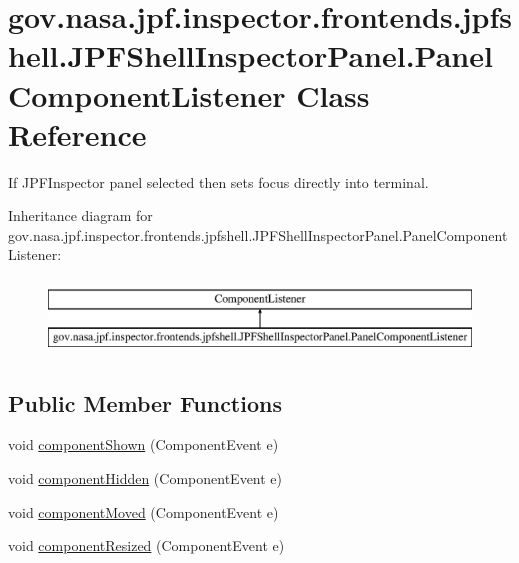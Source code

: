 \hypertarget{classgov_1_1nasa_1_1jpf_1_1inspector_1_1frontends_1_1jpfshell_1_1_j_p_f_shell_inspector_panel_1_1_panel_component_listener}{}\section{gov.\+nasa.\+jpf.\+inspector.\+frontends.\+jpfshell.\+J\+P\+F\+Shell\+Inspector\+Panel.\+Panel\+Component\+Listener Class Reference}
\label{classgov_1_1nasa_1_1jpf_1_1inspector_1_1frontends_1_1jpfshell_1_1_j_p_f_shell_inspector_panel_1_1_panel_component_listener}


If J\+P\+F\+Inspector panel selected then sets focus directly into terminal.  


Inheritance diagram for gov.\+nasa.\+jpf.\+inspector.\+frontends.\+jpfshell.\+J\+P\+F\+Shell\+Inspector\+Panel.\+Panel\+Component\+Listener\+:\begin{figure}[H]
\begin{center}
\leavevmode
\includegraphics[height=2.000000cm]{classgov_1_1nasa_1_1jpf_1_1inspector_1_1frontends_1_1jpfshell_1_1_j_p_f_shell_inspector_panel_1_1_panel_component_listener}
\end{center}
\end{figure}
\subsection*{Public Member Functions}
\begin{DoxyCompactItemize}
\item 
void \hyperlink{classgov_1_1nasa_1_1jpf_1_1inspector_1_1frontends_1_1jpfshell_1_1_j_p_f_shell_inspector_panel_1_1_panel_component_listener_a43288f308290c24116856e5691dcc1b5}{component\+Shown} (Component\+Event e)
\item 
void \hyperlink{classgov_1_1nasa_1_1jpf_1_1inspector_1_1frontends_1_1jpfshell_1_1_j_p_f_shell_inspector_panel_1_1_panel_component_listener_a37238e6461e05fd1719d0bc0434e527e}{component\+Hidden} (Component\+Event e)
\item 
void \hyperlink{classgov_1_1nasa_1_1jpf_1_1inspector_1_1frontends_1_1jpfshell_1_1_j_p_f_shell_inspector_panel_1_1_panel_component_listener_aa0bd6b75bfc172ed2631903a66b1b962}{component\+Moved} (Component\+Event e)
\item 
void \hyperlink{classgov_1_1nasa_1_1jpf_1_1inspector_1_1frontends_1_1jpfshell_1_1_j_p_f_shell_inspector_panel_1_1_panel_component_listener_a87e4b26ee6fc330be28201abde0fc05d}{component\+Resized} (Component\+Event e)
\end{DoxyCompactItemize}


